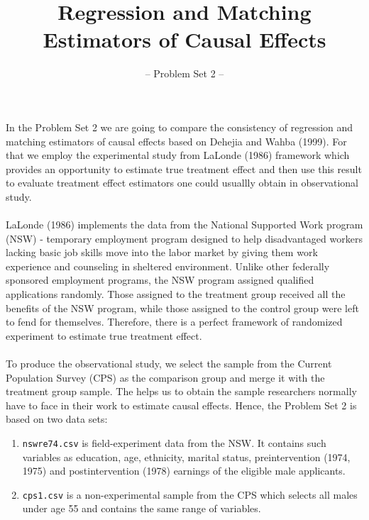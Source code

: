 

\title{Regression and Matching Estimators of Causal Effects}
\subtitle{-- Problem Set 2 --}
\date{}

\maketitle\vspace{-2cm}

In the Problem Set 2 we are going to compare the consistency of regression and matching estimators of causal effects based on Dehejia and Wahba (1999). For that we employ the experimental study from LaLonde (1986) framework which provides an opportunity to estimate true treatment effect and then use this result to evaluate treatment effect estimators one could usuallly obtain in observational study. \\
\\
LaLonde (1986) implements the data from the National Supported Work program (NSW) -  temporary employment program designed to help disadvantaged workers lacking basic job skills move into the labor market by giving them work experience and counseling in sheltered environment. Unlike other federally sponsored employment programs, the NSW program assigned qualified applications randomly. Those assigned to the treatment group received all the benefits of the NSW program, while those assigned to the control group were left to fend for themselves. Therefore, there is a perfect framework of randomized experiment  to estimate true treatment effect. \\
\\
To produce the observational study, we select the sample from the Current Population Survey (CPS) as the comparison group and merge it with the treatment group sample. The helps us to obtain the sample researchers normally have to face in their work to estimate causal effects. Hence, the Problem Set 2 is based on two data sets:

\begin{enumerate}
 
\item \texttt{nswre74.csv} is field-experiment data from the NSW.  It contains such variables as education, age, ethnicity, marital status,  preintervention (1974, 1975) and postintervention (1978) earnings of the eligible male applicants.  

\item \texttt{cps1.csv} is a non-experimental sample from the CPS which selects all males under age 55 and contains the same range of variables.

\end {enumerate}


